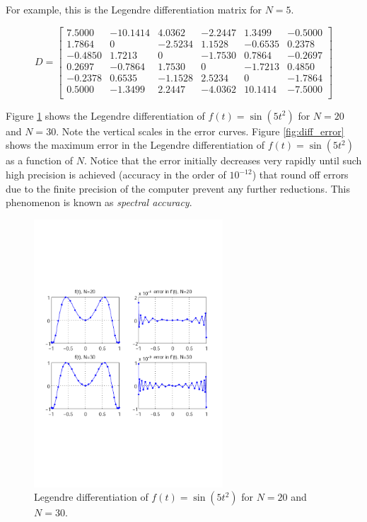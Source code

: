 \documentclass[a4paper,11pt]{report}    %
\begin{document}
For example, this is the Legendre differentiation matrix for $N=5$.

\[
D=
\begin{bmatrix}
   7.5000 & -10.1414  &  4.0362 &  -2.2447&    1.3499&   -0.5000 \\
    1.7864&         0&   -2.5234&    1.1528&   -0.6535&    0.2378 \\
   -0.4850&    1.7213&         0&   -1.7530&    0.7864&   -0.2697  \\
    0.2697&   -0.7864&    1.7530&         0&   -1.7213&    0.4850 \\
   -0.2378&    0.6535&   -1.1528&    2.5234&         0&   -1.7864 \\
    0.5000&   -1.3499&    2.2447&   -4.0362&   10.1414&   -7.5000 \\
\end{bmatrix}
\]





Figure \ref{fig:diff_example}   shows the  Legendre differentiation of $f(t)= \sin(5t^2)$ for $N=20$ and $N=30$. Note the vertical
scales in the error curves. Figure \ref{fig:diff_error} shows the maximum error in the Legendre differentiation of $f(t)=\sin(5t^2)$ as a function of $N$. Notice
that the error initially decreases
very rapidly until such high precision is achieved (accuracy in the order of $10^{-12}$) that round off errors due to
the finite precision of the computer prevent any further reductions. This phenomenon is known as \textit{spectral accuracy}.

\begin{figure}[htbp]
 \centerline{\includegraphics[height=10cm]{derivatives_example}}
\caption{Legendre differentiation of $f(t)=\sin(5t^2)$ for $N=20$ and $N=30$.}
 \label{fig:diff_example} 
\end{figure}
\end{document}
